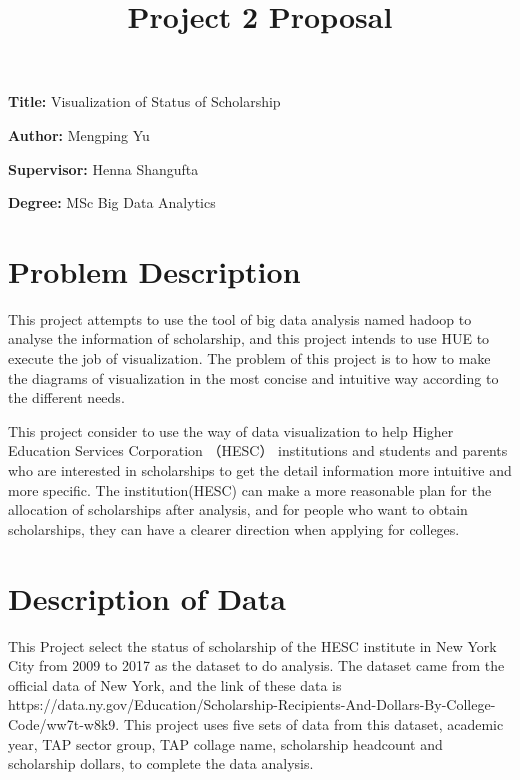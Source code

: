 \documentclass[12pt, a4paper]{article}
\title{Project 2 Proposal}
\author{}
\date{}
\newcommand{\namelistlabel}[1]{\mbox{#1}\hfil}
\newenvironment{namelist}[1]{%
\begin{list}{}
    {
        \let\makelabel\namelistlabel
        \settowidth{\labelwidth}{#1}
        \setlength{\leftmargin}{1.1\labelwidth}
    }
  }{%
\end{list}}
\begin{document}
\maketitle

\begin{namelist}{xxxxxxxxxxxx}
\item[{\bf Title:}]
	Visualization of Status of Scholarship
\item[{\bf Author:}]
	Mengping Yu
\item[{\bf Supervisor:}]
	Henna Shangufta
\item[{\bf Degree:}]
	MSc Big Data Analytics
\end{namelist}
\newpage

\section*{Problem Description} 
This project attempts to use the tool of big data analysis named hadoop to analyse the information of scholarship, and this project intends to use HUE to execute the job of visualization. The problem of this project is to how to make the diagrams of visualization in the most concise and intuitive way according to the different needs. \newline

This project consider to use the way of data visualization to help Higher Education Services Corporation （HESC） institutions and students and parents who are interested in scholarships to get the detail information more intuitive and more specific. The institution(HESC) can make a more reasonable plan for the allocation of scholarships after analysis, and for people who want to obtain scholarships, they can have a clearer direction when applying for colleges.  

\section*{Description of Data} 
This Project select the status of scholarship of the HESC institute in New York City from 2009 to 2017 as the dataset to do analysis. The dataset came from the official data of New York, and the link of these data is https://data.ny.gov/Education/Scholarship-Recipients-And-Dollars-By-College-Code/ww7t-w8k9. This project uses five sets of data from this dataset,  academic year, TAP sector group, TAP collage name, scholarship headcount and scholarship dollars, to complete the data analysis. \newline
\end{document}
